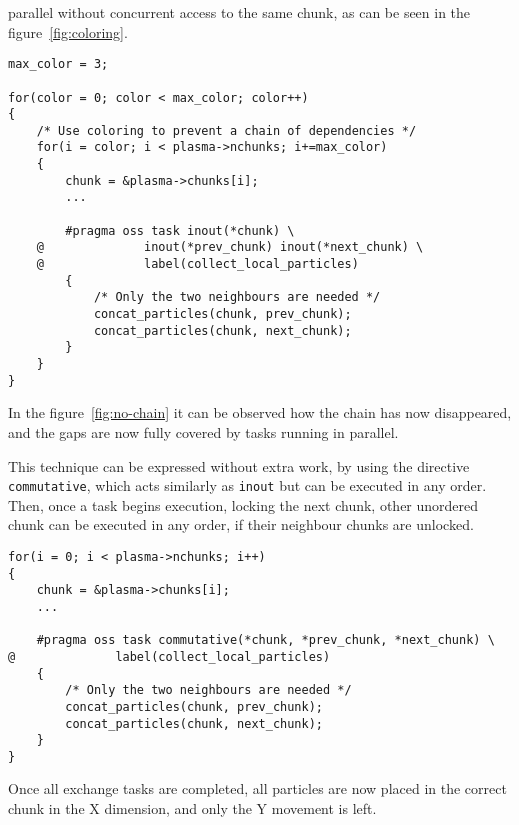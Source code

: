 parallel without concurrent access to the same chunk, as can be seen in the 
figure~\ref{fig:coloring}.
%
\begin{lstlisting}[caption={Exchange of particles in X using the coloring %{{{
technique}]
max_color = 3;

for(color = 0; color < max_color; color++)
{
	/* Use coloring to prevent a chain of dependencies */
	for(i = color; i < plasma->nchunks; i+=max_color)
	{
		chunk = &plasma->chunks[i];
		...

		#pragma oss task inout(*chunk) \
	@              inout(*prev_chunk) inout(*next_chunk) \
	@              label(collect_local_particles)
		{
			/* Only the two neighbours are needed */
			concat_particles(chunk, prev_chunk);
			concat_particles(chunk, next_chunk);
		}
	}
}
\end{lstlisting}%
%
In the figure~\ref{fig:no-chain} it can be observed how the chain has now 
disappeared, and the gaps are now fully covered by tasks running in parallel.

This technique can be expressed without extra work, by using the directive 
\texttt{commutative}, which acts similarly as \texttt{inout} but can be executed 
in any order. Then, once a task begins execution, locking the next chunk, other 
unordered chunk can be executed in any order, if their neighbour chunks are 
unlocked.
%
\begin{lstlisting}[caption={Exchange of particles in X using the %{{{
\texttt{commutative} directive.}]
for(i = 0; i < plasma->nchunks; i++)
{
	chunk = &plasma->chunks[i];
	...

	#pragma oss task commutative(*chunk, *prev_chunk, *next_chunk) \
@              label(collect_local_particles)
	{
		/* Only the two neighbours are needed */
		concat_particles(chunk, prev_chunk);
		concat_particles(chunk, next_chunk);
	}
}
\end{lstlisting}%
%
Once all exchange tasks are completed, all particles are now placed in the 
correct chunk in the X dimension, and only the Y movement is left.

